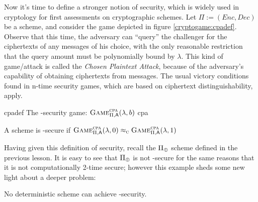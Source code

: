 Now it's time to define a stronger notion of security, which is widely used in cryptology for first assessments on cryptographic schemes. Let $\Pi := (Enc, Dec)$ be a \ske{} scheme, and consider the game depicted in figure \ref{cryptogame:cpadef}. Observe that this time, the adversary can ``query'' the challenger for the ciphertexts of any messages of his choice, with the only reasonable restriction that the query amount must be polynomially bound by $\lambda$. This kind of game/attack is called the \emph{Chosen Plaintext Attack}, because of the adversary's capability of obtaining ciphertexts from messages. The usual victory conditions found in n-time security games, which are based on ciphertext distinguishability, apply.

\begin{cryptogame}
    {cpadef}
    {The \cpa-security game: $\cryptog{cpa}(\lambda, b)$}
    {cpa}


    \cseqbeginloop
    \cseqendloop

    \cseqdelay


    \cseqdelay

    \cseqbeginloop
    \cseqendloop

    \cseqdelay


\end{cryptogame}

\begin{definition}
    A scheme is \cpa-secure if $\cryptog{cpa}(\lambda, 0) \compindist \cryptog{cpa}(\lambda, 1)$
\end{definition}


Having given this definition of security, recall the $\Pi_{\oplus}$ scheme defined in the previous lesson. It is easy to see that $\Pi_{\oplus}$ is not \cpa-secure for the same reasons that it is not computationally 2-time secure; however this example sheds some new light about a deeper problem:

\begin{observation}
    No deterministic scheme can achieve \cpa-security.
\end{observation}

